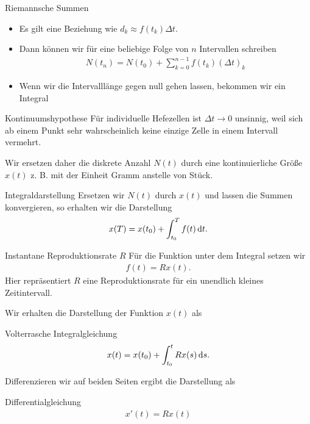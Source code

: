 \begin{frame}{Riemannsche Summen}
  \begin{itemize}
  \item Es gilt eine Beziehung wie
    $d_k \approx f(t_k)\Delta t$.
  \item Dann können wir für eine beliebige Folge von $n$ Intervallen
    schreiben
    \begin{gather*}
      N(t_n) = N(t_0) + \sum_{k=0}^{n-1} f(t_k) (\Delta t)_k
    \end{gather*}
    \item Wenn wir die Intervalllänge gegen null gehen lassen, bekommen wir ein Integral
  \end{itemize}
  \pause
  \begin{block}{Kontinuumshypothese}
    Für individuelle Hefezellen ist $\Delta t \to 0$ unsinnig, weil sich ab einem Punkt sehr wahrscheinlich keine einzige Zelle in einem Intervall vermehrt.

    \vspace{1ex}

    Wir ersetzen daher die diskrete Anzahl $N(t)$ durch eine
    kontinuierliche Größe $x(t)$ z. B. mit der Einheit Gramm anstelle
    von Stück.
  \end{block}
\end{frame}

\begin{frame}{Integraldarstellung}
  Ersetzen wir $N(t)$ durch $x(t)$ und lassen die Summen konvergieren, so erhalten wir die Darstellung
    \begin{gather*}
      x(T) = x(t_0) + \int_{t_0}^T f(t) \,\mathrm{d} t.      
    \end{gather*}
  \begin{block}{Instantane Reproduktionsrate $R$}
    Für die Funktion unter dem Integral setzen wir
    \begin{gather*}
      f(t) = R x(t).
    \end{gather*}
    Hier repräsentiert $R$ eine Reproduktionsrate für ein unendlich kleines Zeitintervall.
  \end{block}
\end{frame}

\begin{frame}
  Wir erhalten die Darstellung der Funktion $x(t)$ als
  \begin{block}{Volterrasche Integralgleichung}
    \begin{gather*}
      x(t) = x(t_0) + \int_{t_0}^t R x(s) \,\mathrm{d} s.      
    \end{gather*}    
  \end{block}

  Differenzieren wir auf beiden Seiten ergibt die Darstellung als
  \begin{block}{Differentialgleichung}
    \begin{gather*}
          x'(t) = R x(t)
    \end{gather*}
  \end{block}
\end{frame}

